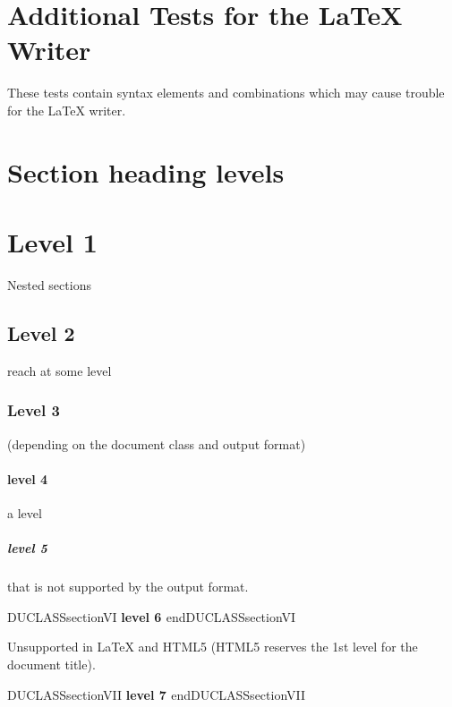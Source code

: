 \documentclass[a4paper]{article}
\newenvironment{DUclass}[1]%
  {%
   \def\DocutilsClassFunctionName{DUCLASS#1}
     \csname \DocutilsClassFunctionName \endcsname}%
  {\csname end\DocutilsClassFunctionName \endcsname}%
\providecommand*{\DUtitle}[1]{%
  \smallskip\noindent\textbf{#1}\smallskip}
\begin{document}
\section{Additional Tests for the LaTeX Writer%
  \label{additional-tests-for-the-latex-writer}%
}

These tests contain syntax elements and combinations which may cause
trouble for the LaTeX writer.


\section{Section heading levels%
  \label{section-heading-levels}%
}


\section{Level 1%
  \label{level-1}%
}

Nested sections


\subsection{Level 2%
  \label{level-2}%
}

reach at some level


\subsubsection{Level 3%
  \label{level-3}%
}

(depending on the document class and output format)


\paragraph{level 4%
  \label{level-4}%
}

a level


\subparagraph{level 5%
  \label{level-5}%
}

that is not supported by the output format.


\begin{DUclass}{sectionVI}
\DUtitle{level 6%
  \label{level-6}%
}
\end{DUclass}

Unsupported in LaTeX and HTML5
(HTML5 reserves the 1st level for the document title).


\begin{DUclass}{sectionVII}
\DUtitle{level 7%
  \label{level-7}%
}
\end{DUclass}
\end{document}
